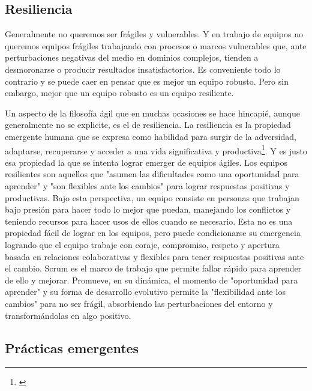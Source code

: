 \subsection{Resiliencia}

Generalmente no queremos ser frágiles y vulnerables. Y en trabajo de equipos no queremos equipos frágiles trabajando con procesos o marcos vulnerables que, ante perturbaciones negativas del medio en dominios complejos, tienden a desmoronarse o producir resultados insatisfactorios. Es conveniente todo lo contrario y se puede caer en pensar que es mejor un equipo robusto. Pero sin embargo, mejor que un equipo robusto es un equipo resiliente. 

Un aspecto de la filosofía ágil que en muchas ocasiones se hace hincapié, aunque generalmente no se explicite, es el de resiliencia. La resiliencia es la propiedad emergente humana que se expresa como habilidad para surgir de la adversidad, adaptarse, recuperarse y acceder a una vida significativa y productiva\footnote{\cite{OPS-OMS-1998}}. Y es justo esa propiedad la que se intenta lograr emerger de equipos ágiles. Los equipos resilientes son aquellos que "asumen las dificultades como una oportunidad para aprender" y "son flexibles ante los cambios" para lograr respuestas positivas y productivas. Bajo esta perspectiva, un equipo consiste en personas que trabajan bajo presión para hacer todo lo mejor que puedan, manejando los conflictos y teniendo recursos para hacer usos de ellos cuando se necesario. Esta no es una propiedad fácil de lograr en los equipos, pero puede condicionarse su emergencia logrando que el equipo trabaje con coraje, compromiso, respeto y apertura basada en relaciones colaborativas y flexibles para tener respuestas positivas ante el cambio. Scrum es el marco de trabajo que permite fallar rápido para aprender de ello y mejorar. Promueve, en su dinámica, el momento de "oportunidad para aprender" y su forma de desarrollo evolutivo permite la "flexibilidad ante los cambios" para no ser frágil, absorbiendo las perturbaciones del entorno y transformándolas en algo positivo.

\subsection{Prácticas emergentes}

